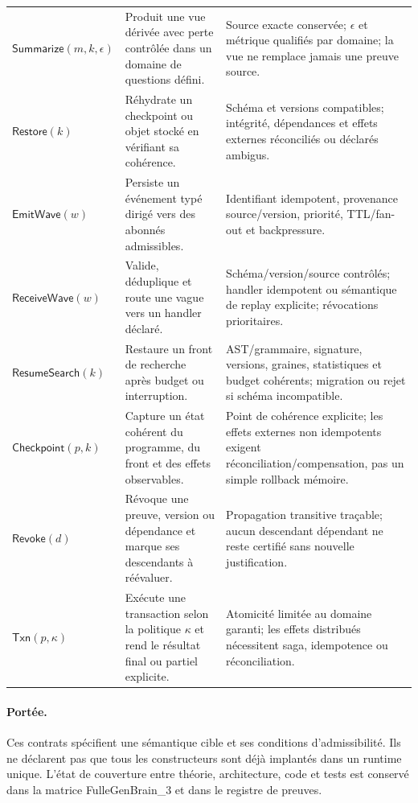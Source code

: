 \documentclass[11pt,a4paper]{article}
\theoremstyle{definition}
\theoremstyle{plain}
\theoremstyle{remark}
\begin{document}
\begin{longtable}{p{}p{}p{}}
\(\mathsf{Summarize}(m,k,\epsilon)\) & Produit une vue dérivée avec perte contrôlée dans un domaine de questions défini. & Source exacte conservée; \(\epsilon\) et métrique qualifiés par domaine; la vue ne remplace jamais une preuve source. \\
\(\mathsf{Restore}(k)\) & Réhydrate un checkpoint ou objet stocké en vérifiant sa cohérence. & Schéma et versions compatibles; intégrité, dépendances et effets externes réconciliés ou déclarés ambigus. \\
\(\mathsf{EmitWave}(w)\) & Persiste un événement typé dirigé vers des abonnés admissibles. & Identifiant idempotent, provenance source/version, priorité, TTL/fan-out et backpressure. \\
\(\mathsf{ReceiveWave}(w)\) & Valide, déduplique et route une vague vers un handler déclaré. & Schéma/version/source contrôlés; handler idempotent ou sémantique de replay explicite; révocations prioritaires. \\
\(\mathsf{ResumeSearch}(k)\) & Restaure un front de recherche après budget ou interruption. & AST/grammaire, signature, versions, graines, statistiques et budget cohérents; migration ou rejet si schéma incompatible. \\
\(\mathsf{Checkpoint}(p,k)\) & Capture un état cohérent du programme, du front et des effets observables. & Point de cohérence explicite; les effets externes non idempotents exigent réconciliation/compensation, pas un simple rollback mémoire. \\
\(\mathsf{Revoke}(d)\) & Révoque une preuve, version ou dépendance et marque ses descendants à réévaluer. & Propagation transitive traçable; aucun descendant dépendant ne reste certifié sans nouvelle justification. \\
\(\mathsf{Txn}(p,\kappa)\) & Exécute une transaction selon la politique \(\kappa\) et rend le résultat final ou partiel explicite. & Atomicité limitée au domaine garanti; les effets distribués nécessitent saga, idempotence ou réconciliation. \\
\bottomrule
\end{longtable}
\paragraph{Portée.} Ces contrats spécifient une sémantique cible et ses conditions d'admissibilité. Ils ne déclarent pas que tous les constructeurs sont déjà implantés dans un runtime unique. L'état de couverture entre théorie, architecture, code et tests est conservé dans la matrice FulleGenBrain\_3 et dans le registre de preuves.
\end{document}
